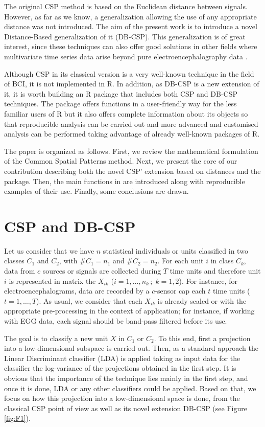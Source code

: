 The original CSP method is based on the Euclidean distance between signals. However, as far as we know,  a generalization allowing the use of any  appropriate distance was not introduced. The aim of the present work is  to introduce a novel Distance-Based generalization of it (DB-CSP). This generalization is of great interest, since these  techniques can also offer good solutions in other fields where multivariate time series data arise  beyond pure electroencephalography data \citep{poppe2010common,  rodriguezmoreno20}. 

Although CSP in its classical version is a very well-known technique in the field of BCI, it is not implemented in R. In addition, as DB-CSP is  a new extension of it, it is worth building an R package that includes both CSP and DB-CSP techniques. The package offers functions  in a user-friendly way for the less familiar users of R but it also offers complete information about its objects so that reproducible analysis can be carried out and more advanced and customised analysis can be performed taking advantage of already well-known packages of R.



The paper is organized as follows. First, we review the mathematical formulation of the Common Spatial Patterns method. Next, we present the core of our contribution describing both the novel CSP' extension based on distances and the  package. Then, the main functions in  are introduced along with reproducible examples of their use. Finally, some conclusions are drawn.

\section{CSP and DB-CSP}
Let us consider that we have $n$ statistical individuals or units classified in two classes $C_1$ and $C_2$, with $\#C_1 = n_1$ and $\#C_2 = n_2$. For each unit $i$ in class $C_k$,  data from $c$ sources or signals are   collected during $T$ time units and therefore unit $i$ is represented in matrix the $X_{ik}$ ($ i = 1, \ldots, n_k\, ; \; k=1, 2$). For instance, for electroencephalograms,
data are recorded  by a $c$-sensor cap each $t$ time units ($t=1, \ldots, T$). 
As usual, we consider that each  $X_{ik}$ is already scaled or with the appropriate pre-processing in the context of application; for instance, if working with EGG data, each signal should be band-pass filtered before its use. 

The goal is to 
classify a new unit $X$ in $C_1$ or $C_2$. To this end, first a projection into a low-dimensional subspace is carried out. Then, as a standard approach the Linear Discriminant classifier (LDA) is applied taking as input data for the classifier the log-variance of the projections obtained in the first step. It is obvious that the importance of the technique lies mainly in the first step, and once it is done, LDA or any other classifiers could be applied. Based on that, we focus on how this projection into a low-dimensional space is done, from the classical CSP point of view as well as its novel extension DB-CSP (see Figure \ref{fig:F1}).

